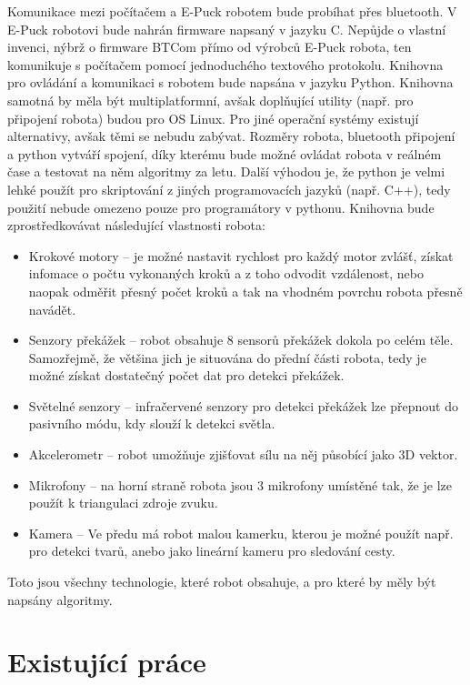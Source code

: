 \documentclass[11pt]{article}
\begin{document}
Komunikace mezi počítačem a E-Puck robotem bude probíhat přes bluetooth. V
E-Puck robotovi bude nahrán firmware napsaný v jazyku C. Nepůjde o vlastní
invenci, nýbrž o firmware BTCom přímo od výrobců E-Puck robota, ten komunikuje s
počítačem pomocí jednoduchého textového protokolu. Knihovna pro ovládání a
komunikaci s robotem bude napsána v jazyku Python. Knihovna samotná by měla být
multiplatformní, avšak doplňující utility (např. pro připojení robota) budou
pro OS Linux. Pro jiné operační systémy existují alternativy, avšak těmi se
nebudu zabývat. Rozměry robota, bluetooth připojení a python vytváří spojení,
díky kterému bude možné ovládat robota v reálném čase a testovat na něm
algoritmy za letu. Další výhodou je, že python je velmi lehké použít pro
skriptování z jiných programovacích jazyků (např. C++), tedy použití nebude
omezeno pouze pro programátory v pythonu. Knihovna bude zprostředkovávat
následující vlastnosti robota:

\begin{itemize}
\item Krokové motory -- je možné nastavit rychlost pro každý motor zvlášť, získat
    infomace o počtu vykonaných kroků a z toho odvodit vzdálenost, nebo naopak
    odměřit přesný počet kroků a tak na vhodném povrchu robota přesně navádět.
\item Senzory překážek -- robot obsahuje 8 sensorů překážek dokola po celém těle.
    Samozřejmě, že většina jich je situována do přední části robota, tedy je
    možné získat dostatečný počet dat pro detekci překážek.
\item Světelné senzory -- infračervené senzory pro detekci překážek lze přepnout
    do pasivního módu, kdy slouží k detekci světla.
\item Akcelerometr -- robot umožňuje zjišťovat sílu na něj působící jako 3D
    vektor.
\item Mikrofony -- na horní straně robota jsou 3 mikrofony umístěné tak, že je
    lze použít k triangulaci zdroje zvuku.
\item Kamera -- Ve předu má robot malou kamerku, kterou je možné použít např. pro
    detekci tvarů, anebo jako lineární kameru pro sledování cesty. 
\end{itemize}

Toto jsou všechny technologie, které robot obsahuje, a pro které by měly být
napsány algoritmy.

\section{Existující práce}
\end{document}
